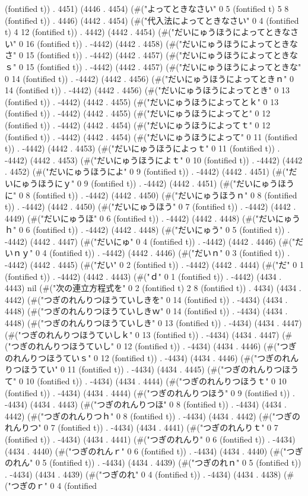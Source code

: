 (fontified t)) . 4451) (4446 . 4454) (#("よってときなさい" 0 5 (fontified t) 5 8 (fontified t)) . 4446) (4442 . 4454) (#("代入法によってときなさい" 0 4 (fontified t) 4 12 (fontified t)) . 4442) (4442 . 4454) (#("だいにゅうほうによってときなさい" 0 16 (fontified t)) . -4442) (4442 . 4458) (#("だいにゅうほうによってときなさ" 0 15 (fontified t)) . -4442) (4442 . 4457) (#("だいにゅうほうによってときなｓ" 0 15 (fontified t)) . -4442) (4442 . 4457) (#("だいにゅうほうによってときな" 0 14 (fontified t)) . -4442) (4442 . 4456) (#("だいにゅうほうによってときｎ" 0 14 (fontified t)) . -4442) (4442 . 4456) (#("だいにゅうほうによってとき" 0 13 (fontified t)) . -4442) (4442 . 4455) (#("だいにゅうほうによってとｋ" 0 13 (fontified t)) . -4442) (4442 . 4455) (#("だいにゅうほうによってと" 0 12 (fontified t)) . -4442) (4442 . 4454) (#("だいにゅうほうによってｔ" 0 12 (fontified t)) . -4442) (4442 . 4454) (#("だいにゅうほうによって" 0 11 (fontified t)) . -4442) (4442 . 4453) (#("だいにゅうほうによっｔ" 0 11 (fontified t)) . -4442) (4442 . 4453) (#("だいにゅうほうによｔ" 0 10 (fontified t)) . -4442) (4442 . 4452) (#("だいにゅうほうによ" 0 9 (fontified t)) . -4442) (4442 . 4451) (#("だいにゅうほうにｙ" 0 9 (fontified t)) . -4442) (4442 . 4451) (#("だいにゅうほうに" 0 8 (fontified t)) . -4442) (4442 . 4450) (#("だいにゅうほうｎ" 0 8 (fontified t)) . -4442) (4442 . 4450) (#("だいにゅうほう" 0 7 (fontified t)) . -4442) (4442 . 4449) (#("だいにゅうほ" 0 6 (fontified t)) . -4442) (4442 . 4448) (#("だいにゅうｈ" 0 6 (fontified t)) . -4442) (4442 . 4448) (#("だいにゅう" 0 5 (fontified t)) . -4442) (4442 . 4447) (#("だいにゅ" 0 4 (fontified t)) . -4442) (4442 . 4446) (#("だいｎｙ" 0 4 (fontified t)) . -4442) (4442 . 4446) (#("だいｎ" 0 3 (fontified t)) . -4442) (4442 . 4445) (#("だい" 0 2 (fontified t)) . -4442) (4442 . 4444) (#("だ" 0 1 (fontified t)) . -4442) (4442 . 4443) (#("ｄ" 0 1 (fontified t)) . -4442) (4434 . 4443) nil (#("次の連立方程式を" 0 2 (fontified t) 2 8 (fontified t)) . 4434) (4434 . 4442) (#("つぎのれんりつほうていしきを" 0 14 (fontified t)) . -4434) (4434 . 4448) (#("つぎのれんりつほうていしきｗ" 0 14 (fontified t)) . -4434) (4434 . 4448) (#("つぎのれんりつほうていしき" 0 13 (fontified t)) . -4434) (4434 . 4447) (#("つぎのれんりつほうていしｋ" 0 13 (fontified t)) . -4434) (4434 . 4447) (#("つぎのれんりつほうていし" 0 12 (fontified t)) . -4434) (4434 . 4446) (#("つぎのれんりつほうていｓ" 0 12 (fontified t)) . -4434) (4434 . 4446) (#("つぎのれんりつほうてい" 0 11 (fontified t)) . -4434) (4434 . 4445) (#("つぎのれんりつほうて" 0 10 (fontified t)) . -4434) (4434 . 4444) (#("つぎのれんりつほうｔ" 0 10 (fontified t)) . -4434) (4434 . 4444) (#("つぎのれんりつほう" 0 9 (fontified t)) . -4434) (4434 . 4443) (#("つぎのれんりつほ" 0 8 (fontified t)) . -4434) (4434 . 4442) (#("つぎのれんりつｈ" 0 8 (fontified t)) . -4434) (4434 . 4442) (#("つぎのれんりつ" 0 7 (fontified t)) . -4434) (4434 . 4441) (#("つぎのれんりｔ" 0 7 (fontified t)) . -4434) (4434 . 4441) (#("つぎのれんり" 0 6 (fontified t)) . -4434) (4434 . 4440) (#("つぎのれんｒ" 0 6 (fontified t)) . -4434) (4434 . 4440) (#("つぎのれん" 0 5 (fontified t)) . -4434) (4434 . 4439) (#("つぎのれｎ" 0 5 (fontified t)) . -4434) (4434 . 4439) (#("つぎのれ" 0 4 (fontified t)) . -4434) (4434 . 4438) (#("つぎのｒ" 0 4 (fontified 
